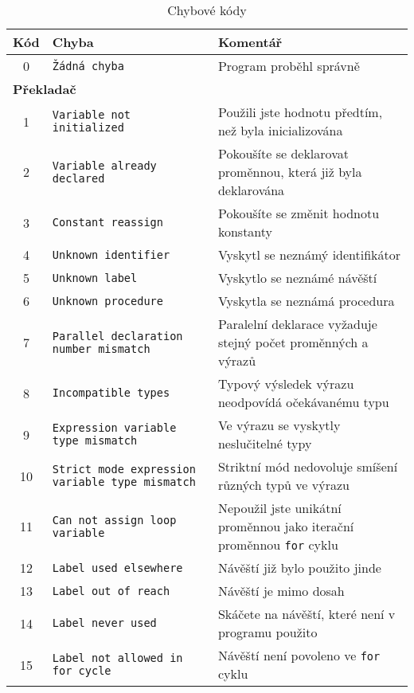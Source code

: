 \documentclass[
12pt,
a4paper,
pdftex,
czech
]{report}
\begin{document}
\begin{longtable}{|c|p{5.5cm}|p{6.5cm}|}
\caption{Chybové kódy}
\label{chyby}
\endfirsthead
\endhead
\hline
		\textbf{Kód} & \textbf{Chyba} & \textbf{Komentář} \\
\hline\hline
\rule{0pt}{3ex}0 & \texttt{Žádná chyba} & Program proběhl správně \\ \hline
\multicolumn{3}{|l|}{\textbf{Překladač}}\\ \hline
\rule{0pt}{3ex}1 & \texttt{Variable not initialized} & Použili jste hodnotu předtím, než byla inicializována \\ \hline
\rule{0pt}{3ex}2 & \texttt{Variable already declared} & Pokoušíte se deklarovat proměnnou, která již byla deklarována \\ \hline
\rule{0pt}{3ex}3 & \texttt{Constant reassign} & Pokoušíte se změnit hodnotu konstanty \\ \hline
\rule{0pt}{3ex}4 & \texttt{Unknown identifier} & Vyskytl se neznámý identifikátor \\ \hline
\rule{0pt}{3ex}5 & \texttt{Unknown label} & Vyskytlo se neznámé návěští \\ \hline
\rule{0pt}{3ex}6 & \texttt{Unknown procedure} & Vyskytla se neznámá procedura \\ \hline
\rule{0pt}{3ex}7 & \texttt{Parallel declaration number mismatch} & Paralelní deklarace vyžaduje stejný počet proměnných a výrazů\\ \hline
\rule{0pt}{3ex}8 & \texttt{Incompatible types} & Typový výsledek výrazu neodpovídá očekávanému typu \\ \hline
\rule{0pt}{3ex}9 & \texttt{Expression variable type mismatch} & Ve výrazu se vyskytly neslučitelné typy \\ \hline
\rule{0pt}{3ex}10 & \texttt{Strict mode expression variable type mismatch} & Striktní mód nedovoluje smíšení různých typů ve výrazu \\ \hline
\rule{0pt}{3ex}11 & \texttt{Can not assign loop variable} & Nepoužil jste unikátní proměnnou jako iterační proměnnou \texttt{for} cyklu \\ \hline
\rule{0pt}{3ex}12 & \texttt{Label used elsewhere} & Návěští již bylo použito jinde \\ \hline
\rule{0pt}{3ex}13 & \texttt{Label out of reach} & Návěští je mimo dosah \\ \hline
\rule{0pt}{3ex}14 & \texttt{Label never used} & Skáčete na návěští, které není v programu použito \\ \hline
\rule{0pt}{3ex}15 & \texttt{Label not allowed in for cycle} & Návěští není povoleno ve \texttt{for} cyklu \\ \hline

\end{longtable}
\end{document}

